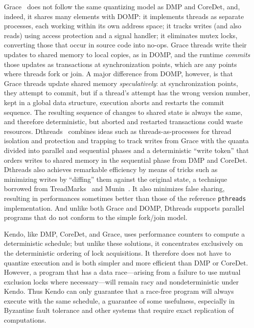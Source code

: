 Grace~\cite{berger09grace} does not follow the same quantizing model as DMP and CoreDet, and, indeed, it shares many elements with DOMP:  it implements threads as separate processes, each working within its own address space; it tracks writes (and also reads) using access protection and a signal handler; it eliminates mutex locks, converting those that occur in source code into no-ops.  Grace threads write their updates to shared memory to local copies, as in DOMP, and the runtime \textit{commits} those updates as transactions at synchronization points, which are any points where threads fork or join.  A major difference from DOMP, however, is that Grace threads update shared memory \textit{speculatively}:  at synchronization points, they attempt to commit, but if a thread's attempt has the wrong version number, kept in a global data structure, execution aborts and restarts the commit sequence.  The resulting sequence of changes to shared state is always the same, and therefore deterministic, but aborted and restarted transactions could waste resources.  Dthreads~\cite{liu11dthreads} combines ideas such as threads-as-processes for thread isolation and protection and trapping to track writes from Grace with the quanta divided into parallel and sequential phases and a deterministic ``write token'' that orders writes to shared memory in the sequential phase from DMP and CoreDet.  Dthreads also achieves remarkable efficiency by means of tricks such as minimizing writes by ``diffing'' them against the original state, a technique borrowed from TreadMarks~\cite{amza96treadmarks} and Munin~\cite{bennett90munin}.  It also minimizes false sharing, resulting in performances sometimes better than those of the reference \texttt{pthreads} implementation.   And unlike both Grace and DOMP, Dthreads supports parallel programs that do not conform to the simple fork/join model.

Kendo, like DMP, CoreDet, and Grace, uses performance counters to compute a deterministic schedule; but unlike these solutions, it concentrates exclusively on the deterministic ordering of lock acquisitions.  It therefore does not have to quantize execution and is both simpler and more efficient than DMP or CoreDet.   However, a program that has a data race---arising from a failure to use mutual exclusion locks where necessary---will remain racy and nondeterministic under Kendo.  Thus Kendo can only guarantee that a race-free program will always execute with the same schedule, a guarantee of some usefulness, especially in Byzantine fault tolerance and other systems that require exact replication of computations.

